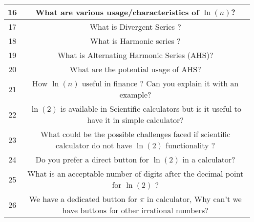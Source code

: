 \documentclass{article}
\begin{document}
\begin{table}[h!]
\begin{center}
\begin{tabular}{c|c}
         \hline
         16 & What are various usage/characteristics of $\ln(n)$? \\
         \hline
         17 & What is Divergent Series ? \\
         \hline
         18 & What is Harmonic series ? \\
         \hline
         19 & What is Alternating Harmonic Series (AHS)? \\
         \hline
         20 & What are the potential usage of AHS? \\
         \hline
         21 & How $\ln(n)$ useful in finance ? Can you explain it with an example?\\
         \hline
         22 & $\ln(2)$ is available in Scientific calculators but is it useful to have it in simple calculator?\\
         \hline
         23 & What could be the possible challenges faced if scientific calculator do not have $\ln(2)$ functionality ?\\
         \hline
         24 & Do you prefer a direct button for $\ln(2)$ in a calculator?\\
         \hline
         25 & What is an acceptable number of digits after the decimal point for $\ln(2)$ ?\\
         \bottomrule
         26 & We have a dedicated button for $\pi$ in calculator, Why can't we have buttons for other irrational numbers?\\
         \bottomrule
    \end{tabular}
    \end{center}
\end{table}
\newpage
\end{document}

